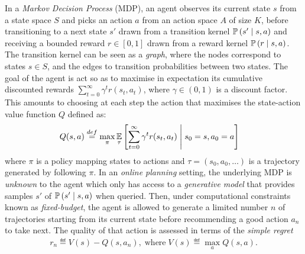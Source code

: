 \documentclass[runningheads]{llncs}
\begin{document}
In a \emph{Markov Decision Process} (MDP), an agent observes its current state $s$ from a state space $S$ and picks an action $a$ from an action space $A$ of size $K$, before transitioning to a next state $s'$ drawn from a transition kernel $\mathbb{P}\left(s'\;\middle|\; s,a\right)$ and receiving a bounded reward $r\in[0, 1]$ drawn from a reward kernel $\mathbb{P}\left(r \;\middle|\; s, a\right)$. The transition kernel can be seen as a \emph{graph}, where the nodes correspond to states $s\in S$, and the edges to transition probabilities between two states. The goal of the agent is act so as to maximise in expectation its cumulative discounted rewards $\sum_{t=0}^\infty \gamma^t r(s_t, a_t)$, where $\gamma\in(0, 1)$ is a discount factor. This amounts to choosing at each step the action that maximises the state-action value function $Q$ defined as:
\begin{align*}
Q(s, a) &\stackrel{def}{=} \max_\pi  \operatorname*{\mathbb{E}}_\tau \left[\sum_{t=0}^\infty \gamma^t r(s_t, a_t)\;\middle|\; s_0 = s, a_0 = a\right]
\end{align*}
where $\pi$ is a policy mapping states to actions and $\tau = (s_0, a_0, \dots)$ is a trajectory generated by following $\pi$. In an \emph{online planning} setting, the underlying MDP is \emph{unknown} to the agent which only has access to a \emph{generative model} that provides samples $s'$ of $\mathbb{P}\left(s' \;\middle|\; s, a\right)$ when queried. Then, under computational constraints known as \emph{fixed-budget}, the agent is allowed to generate a limited number $n$ of trajectories starting from its current state before recommending a good action $a_n$ to take next.
The quality of that action is assessed in terms of the \emph{simple regret}
\begin{align}
	r_n \eqdef V(s) - Q(s, {a}_n), \; \mbox{where} \; V(s) \eqdef  \max_a Q(s, a).
\end{align}
\end{document}
